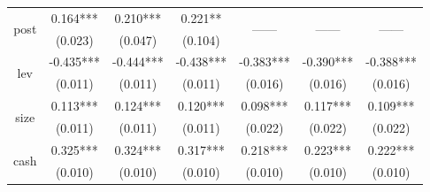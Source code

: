 \documentclass{beamer}	%
\theoremstyle{plain}
\theoremstyle{definition}
\theoremstyle{remark}
\numberwithin{equation}{section}
\begin{document}
\begin{frame}
\begin{table}[htbp]
\begin{tabular}{ccccccc}
		    \multirow{2}[0]{*}{post}     &                   0.164***                    &                   0.210***                    &                   0.221**                    &             \multirow{2}[0]{*}{——}             &             \multirow{2}[0]{*}{——}             &            \multirow{2}[0]{*}{——}             \\
		                                 &                    (0.023)                    &                    (0.047)                    &                   (0.104)                    &                                                &                                                &                                               \\
		    \multirow{2}[0]{*}{lev}      &                   -0.435***                   &                   -0.444***                   &                  -0.438***                   &                   -0.383***                    &                   -0.390***                    &                   -0.388***                   \\
		                                 &                    (0.011)                    &                    (0.011)                    &                   (0.011)                    &                    (0.016)                     &                    (0.016)                     &                    (0.016)                    \\
		    \multirow{2}[0]{*}{size}     &                   0.113***                    &                   0.124***                    &                   0.120***                   &                    0.098***                    &                    0.117***                    &                   0.109***                    \\
		                                 &                    (0.011)                    &                    (0.011)                    &                   (0.011)                    &                    (0.022)                     &                    (0.022)                     &                    (0.022)                    \\
		    \multirow{2}[0]{*}{cash}     &                   0.325***                    &                   0.324***                    &                   0.317***                   &                    0.218***                    &                    0.223***                    &                   0.222***                    \\
		                                 &                    (0.010)                    &                    (0.010)                    &                   (0.010)                    &                    (0.010)                     &                    (0.010)                     &                    (0.010)                    \\

\end{tabular}
\end{table}
\end{frame}
\end{document}

